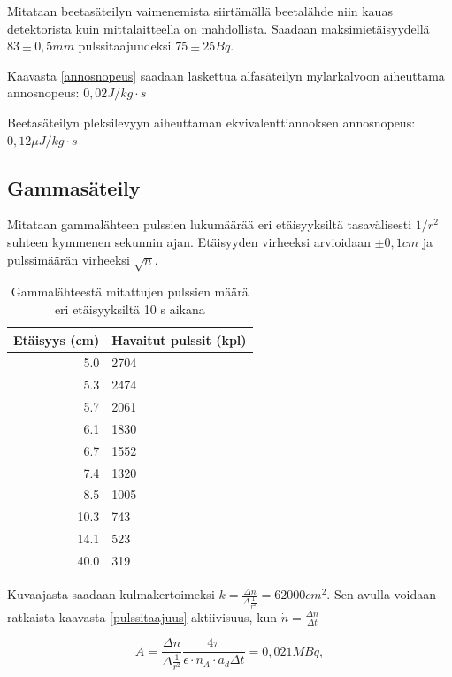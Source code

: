 \documentclass[a4paper,11pt]{article}
\begin{document}
Mitataan beetasäteilyn vaimenemista siirtämällä beetalähde niin kauas detektorista kuin mittalaitteella on mahdollista. Saadaan maksimietäisyydellä $83 \pm 0,5 mm$ pulssitaajuudeksi $75 \pm 25 Bq$. 

Kaavasta \ref{annosnopeus} saadaan laskettua alfasäteilyn mylarkalvoon aiheuttama annosnopeus: $0,02 J/kg \cdot s$

Beetasäteilyn pleksilevyyn aiheuttaman ekvivalenttiannoksen annosnopeus: $0,12 \mu J / kg \cdot s$


\subsection{Gammasäteily}
\label{tulokset:gamma}

Mitataan gammalähteen pulssien lukumäärää eri etäisyyksiltä tasavälisesti $1/r^2$ suhteen kymmenen sekunnin ajan. Etäisyyden virheeksi arvioidaan $\pm 0,1 cm$ ja pulssimäärän virheeksi $\sqrt{n}$.

\begin{table}[H]
\begin{center}
\caption{Gammalähteestä mitattujen pulssien määrä eri etäisyyksiltä 10 s aikana}
\begin{tabular}{ | r | l | }
  \hline
Etäisyys (cm) & Havaitut pulssit (kpl) \\ \hline
5.0 & 2704 \\ \hline
5.3 & 2474 \\ \hline
5.7 & 2061 \\ \hline
6.1 & 1830 \\ \hline
6.7 & 1552 \\ \hline
7.4 & 1320 \\ \hline
8.5 & 1005 \\ \hline
10.3 & 743 \\ \hline
14.1 & 523 \\ \hline
40.0 & 319 \\ \hline
\end{tabular}
\end{center}
\end{table}


Kuvaajasta saadaan kulmakertoimeksi $k = \frac{\Delta{n}}{\Delta \frac{1}{r^2}} = 62 000 cm^2$. Sen avulla voidaan ratkaista kaavasta \ref{pulssitaajuus} aktiivisuus, kun $\dot{n} = \frac{\Delta n}{\Delta t}$ 

\begin{equation}
  A = \frac{\Delta n}{\Delta \frac{1}{r^2}} \frac{4 \pi }{\epsilon \cdot n_A \cdot a_d \Delta t} = 0,021 MBq ,
\end{equation}
\end{document}

